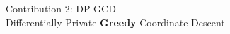 \documentclass[17pt,aspectratio=169]{beamer}
\begin{document}
\begin{frame}{Contribution 2: DP-GCD \\[-0.5em]
    \normalsize Differentially Private {\bfseries{Greedy}} Coordinate Descent}


  \vspace{1.1em}

\end{frame}
\end{document}
